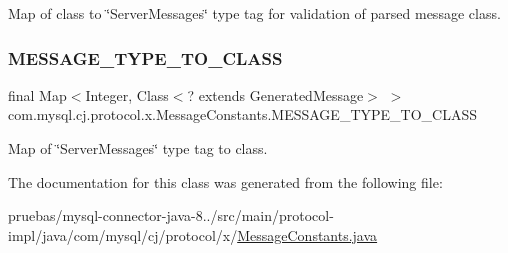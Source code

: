 Map of class to \char`\"{}\+Server\+Messages\char`\"{} type tag for validation of parsed message class. \mbox{\label{classcom_1_1mysql_1_1cj_1_1protocol_1_1x_1_1_message_constants_afcd94ad22ee22dcac79ee95c4473db49}} 
\subsubsection{\texorpdfstring{M\+E\+S\+S\+A\+G\+E\+\_\+\+T\+Y\+P\+E\+\_\+\+T\+O\+\_\+\+C\+L\+A\+SS}{MESSAGE\_TYPE\_TO\_CLASS}}
{\footnotesize\ttfamily final Map$<$Integer, Class$<$? extends Generated\+Message$>$ $>$ com.\+mysql.\+cj.\+protocol.\+x.\+Message\+Constants.\+M\+E\+S\+S\+A\+G\+E\+\_\+\+T\+Y\+P\+E\+\_\+\+T\+O\+\_\+\+C\+L\+A\+SS\hspace{0.3cm}{\ttfamily [static]}}

Map of \char`\"{}\+Server\+Messages\char`\"{} type tag to class. 

The documentation for this class was generated from the following file\+:\begin{DoxyCompactItemize}
\item 
pruebas/mysql-\/connector-\/java-\/8../src/main/protocol-\/impl/java/com/mysql/cj/protocol/x/\mbox{\hyperlink{_message_constants_8java}{Message\+Constants.\+java}}\end{DoxyCompactItemize}
